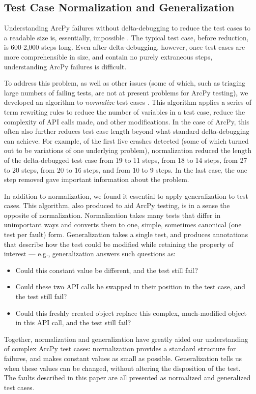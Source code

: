 \subsection{Test Case Normalization and Generalization}

Understanding ArcPy failures without delta-debugging \cite{DD} to reduce the
test cases to a readable size is, essentially, impossible \cite{MinUnit}.  The
typical test case, before reduction, is 600-2,000 steps long.  Even
after delta-debugging, however, once test cases are more
comprehensible in size, and contain no purely extraneous steps,
understanding ArcPy failures is difficult.

To address this problem, as well as other issues (some of which, such
as triaging large numbers of failing tests, are not at present
problems for ArcPy testing), we developed an algorithm to
\emph{normalize} test cases \cite{ICSTnorm}.  This algorithm applies a series of term
rewriting rules to reduce the number of variables in a test case,
reduce the complexity of API calls made, and other modifications.  In
the case of ArcPy, this often also further reduces test case length
beyond what standard delta-debugging can achieve.  For example, of the
first five crashes detected (some of which turned out to be variations
of one underlying problem), normalization reduced the length of the
delta-debugged test case from 19 to 11 steps, from 18 to 14 steps,
from 27 to 20 steps, from 20 to 16 steps, and from 10 to 9 steps.  In
the last case, the one step removed gave important information about
the problem.

In addition to normalization, we found it essential to apply
generalization \cite{SmartCheck,ICSTnorm} to test cases.  This
algorithm, also produced to aid ArcPy testing, is in a sense the
opposite of normalization.  Normalization takes many tests that differ
in unimportant ways and converts them to one, simple, sometimes
canonical (one test per fault) form.  Generalization takes a single
test, and produces annotations that describe how the test could be
modified while retaining the property of interest --- e.g.,
generalization answers such questions as:

\begin{itemize}
\item Could this
constant value be different, and the test still fail?
\item Could these two API calls be swapped in their position in the
  test case, and the test still fail?
\item Could this freshly created object replace this complex,
  much-modified object in this API call, and the test still fail?
\end{itemize}

Together, normalization and generalization have greatly aided our
understanding of complex ArcPy test cases:  normalization provides a
standard structure for failures, and makes constant values as small as
possible. Generalization tells us when these values can be changed,
without altering the disposition of the test.  The faults described in
this paper are all presented as normalized and generalized test cases.